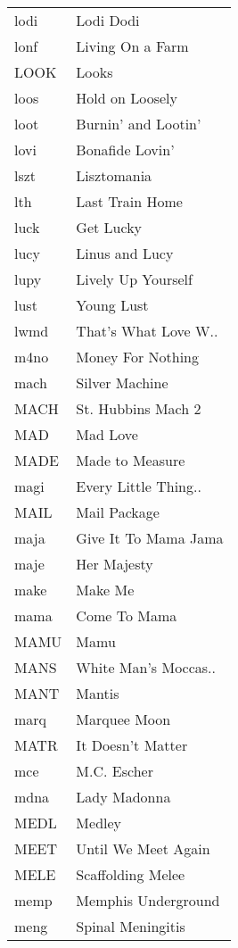 \begin{supertabular}{ll}
 lodi &             Lodi Dodi \\
 lonf &      Living On a Farm \\
 LOOK &                 Looks \\
 loos &       Hold on Loosely \\
 loot &   Burnin' and Lootin' \\
 lovi &       Bonafide Lovin' \\
 lszt &           Lisztomania \\
  lth &       Last Train Home \\
 luck &             Get Lucky \\
 lucy &        Linus and Lucy \\
 lupy &    Lively Up Yourself \\
 lust &            Young Lust \\
 lwmd &  That's What Love W.. \\
 m4no &     Money For Nothing \\
 mach &        Silver Machine \\
 MACH &    St. Hubbins Mach 2 \\
  MAD &              Mad Love \\
 MADE &       Made to Measure \\
 magi &  Every Little Thing.. \\
 MAIL &          Mail Package \\
 maja &  Give It To Mama Jama \\
 maje &           Her Majesty \\
 make &               Make Me \\
 mama &          Come To Mama \\
 MAMU &                  Mamu \\
 MANS &  White Man's Moccas.. \\
 MANT &                Mantis \\
 marq &          Marquee Moon \\
 MATR &     It Doesn't Matter \\
  mce &           M.C. Escher \\
 mdna &          Lady Madonna \\
 MEDL &                Medley \\
 MEET &   Until We Meet Again \\
 MELE &     Scaffolding Melee \\
 memp &   Memphis Underground \\
 meng &     Spinal Meningitis \\

\end{supertabular}
